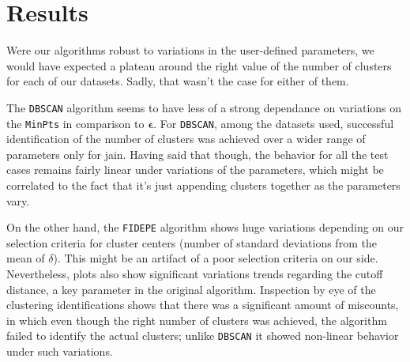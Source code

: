 \documentclass[12pt]{article}
\begin{document}
\section{Results}

\par Were our algorithms robust to variations in the user-defined parameters, we would have expected a plateau around the right value of the number of clusters for each of our datasets. Sadly, that wasn't the case for either of them.
\par The \texttt{DBSCAN} algorithm seems to have less of a strong dependance on variations on the \texttt{MinPts} in comparison to $\boldsymbol{\epsilon}$. For \texttt{DBSCAN}, among the datasets used, successful identification of the number of clusters was achieved over a wider range of parameters only for jain. Having said that though, the behavior for all the test cases remains fairly linear under variations of the parameters, which might be correlated to the fact that it's just appending clusters together as the parameters vary.
 
\par On the other hand, the \texttt{FIDEPE} algorithm shows huge variations depending on our selection criteria for cluster centers (number of standard deviations from the mean of $\delta$). This might be an artifact of a poor selection criteria on our side. Nevertheless, plots also show significant variations trends regarding the cutoff distance, a key parameter in the original algorithm. Inspection by eye of the clustering identifications shows that there was a significant amount of miscounts, in which even though the right number of clusters was achieved, the algorithm failed to identify the actual clusters; unlike  \texttt{DBSCAN} it showed non-linear behavior under such variations.
\end{document}
